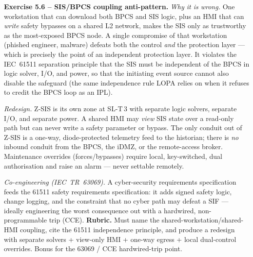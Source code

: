 \documentclass[11pt,a4paper]{article}
\begin{document}
\begin{solutionbox}
\textbf{Exercise 5.6 -- SIS/BPCS coupling anti-pattern.}
\emph{Why it is wrong.} One workstation that can download both BPCS and SIS logic, plus an HMI that can \emph{write} safety bypasses on a shared L2 network, makes the SIS only as trustworthy as the most-exposed BPCS node. A single compromise of that workstation (phished engineer, malware) defeats both the control \emph{and} the protection layer --- which is precisely the point of an independent protection layer. It violates the IEC~61511 separation principle that the SIS must be independent of the BPCS in logic solver, I/O, and power, so that the initiating event source cannot also disable the safeguard (the same independence rule LOPA relies on when it refuses to credit the BPCS loop as an IPL).
\par\vspace{2mm}
\emph{Redesign.} Z-SIS is its own zone at SL-T\,3 with separate logic solvers, separate I/O, and separate power. A shared HMI may \emph{view} SIS state over a read-only path but can never write a safety parameter or bypass. The only conduit out of Z-SIS is a one-way, diode-protected telemetry feed to the historian; there is \emph{no} inbound conduit from the BPCS, the iDMZ, or the remote-access broker. Maintenance overrides (forces/bypasses) require local, key-switched, dual authorisation and raise an alarm --- never settable remotely.
\par\vspace{2mm}
\emph{Co-engineering (IEC~TR~63069).} A cyber-security requirements specification feeds the 61511 safety requirements specification: it adds signed safety logic, change logging, and the constraint that no cyber path may defeat a SIF --- ideally engineering the worst consequence out with a hardwired, non-programmable trip (CCE). \textbf{Rubric.} Must name the shared-workstation/shared-HMI coupling, cite the 61511 independence principle, and produce a redesign with separate solvers + view-only HMI + one-way egress + local dual-control overrides. Bonus for the 63069 / CCE hardwired-trip point.
\end{solutionbox}
\end{document}
